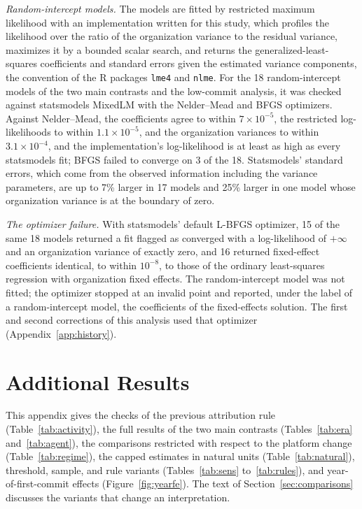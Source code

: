 \documentclass[acmsmall,screen,review,anonymous]{acmart}
\begin{document}
\textit{Random-intercept models.} The models are fitted by restricted maximum likelihood with an implementation written for this study, which profiles the likelihood over the ratio of the organization variance to the residual variance, maximizes it by a bounded scalar search, and returns the generalized-least-squares coefficients and standard errors given the estimated variance components, the convention of the R packages \texttt{lme4} and \texttt{nlme}. For the 18 random-intercept models of the two main contrasts and the low-commit analysis, it was checked against statsmodels MixedLM with the Nelder--Mead and BFGS optimizers. Against Nelder--Mead, the coefficients agree to within $7 \times 10^{-5}$, the restricted log-likelihoods to within $1.1 \times 10^{-5}$, and the organization variances to within $3.1 \times 10^{-4}$, and the implementation's log-likelihood is at least as high as every statsmodels fit; BFGS failed to converge on 3 of the 18. Statsmodels' standard errors, which come from the observed information including the variance parameters, are up to 7\% larger in 17 models and 25\% larger in one model whose organization variance is at the boundary of zero.

\textit{The optimizer failure.} With statsmodels' default L-BFGS optimizer, 15 of the same 18 models returned a fit flagged as converged with a log-likelihood of $+\infty$ and an organization variance of exactly zero, and 16 returned fixed-effect coefficients identical, to within $10^{-8}$, to those of the ordinary least-squares regression with organization fixed effects. The random-intercept model was not fitted; the optimizer stopped at an invalid point and reported, under the label of a random-intercept model, the coefficients of the fixed-effects solution. The first and second corrections of this analysis used that optimizer (Appendix~\ref{app:history}).

\section{Additional Results}
\label{app:sens}

This appendix gives the checks of the previous attribution rule (Table~\ref{tab:activity}), the full results of the two main contrasts (Tables~\ref{tab:era} and~\ref{tab:agent}), the comparisons restricted with respect to the platform change (Table~\ref{tab:regime}), the capped estimates in natural units (Table~\ref{tab:natural}), threshold, sample, and rule variants (Tables~\ref{tab:sens} to~\ref{tab:rules}), and year-of-first-commit effects (Figure~\ref{fig:yearfe}). The text of Section~\ref{sec:comparisons} discusses the variants that change an interpretation.
\end{document}
